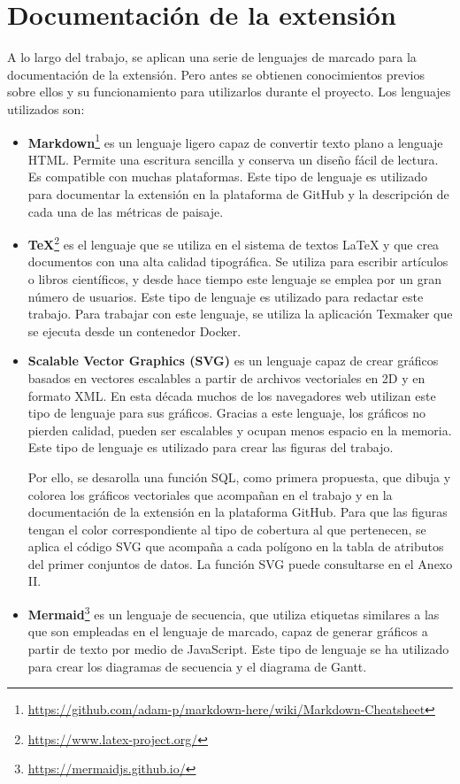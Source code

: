 \section{Documentación de la extensión}
A lo largo del trabajo, se aplican una serie de lenguajes de marcado para la documentación de la extensión. Pero antes se obtienen conocimientos previos sobre ellos y su funcionamiento para utilizarlos durante el proyecto. Los lenguajes utilizados son:
\begin{itemize}
\item\textbf{Markdown}\footnote{\url{https://github.com/adam-p/markdown-here/wiki/Markdown-Cheatsheet}} es un lenguaje ligero capaz de convertir texto plano a lenguaje HTML. Permite una escritura sencilla y conserva un diseño fácil de lectura. Es compatible con muchas plataformas. Este tipo de lenguaje es utilizado para documentar la extensión en la plataforma de GitHub y la descripción de cada una de las métricas de paisaje.
\item\textbf{TeX}\footnote{\url{https://www.latex-project.org/}} es el lenguaje que se utiliza en el sistema de textos LaTeX y que crea documentos con una alta calidad tipográfica. Se utiliza para escribir artículos o libros científicos, y desde hace tiempo este lenguaje se emplea por un gran número de usuarios. Este tipo de lenguaje es utilizado para redactar este trabajo. Para trabajar con este lenguaje, se utiliza la aplicación Texmaker que se ejecuta desde un contenedor Docker.
\item\textbf{Scalable Vector Graphics (SVG)} es un lenguaje capaz de crear gráficos basados en vectores escalables a partir de archivos vectoriales en 2D y en formato XML. En esta década muchos de los navegadores web utilizan este tipo de lenguaje para sus gráficos. Gracias a este lenguaje, los gráficos no pierden calidad, pueden ser escalables y ocupan menos espacio en la memoria. Este tipo de lenguaje es utilizado para crear las figuras del trabajo.

Por ello, se desarolla una función SQL, como primera propuesta, que dibuja y colorea los gráficos vectoriales que acompañan en el trabajo y en la documentación de la extensión en la plataforma GitHub. Para que las figuras tengan el color correspondiente al tipo de cobertura al que pertenecen, se aplica el código SVG que acompaña a cada polígono en la tabla de atributos del primer conjuntos de datos. La función SVG puede consultarse en el Anexo II.
\item\textbf{Mermaid}\footnote{\url{https://mermaidjs.github.io/}} es un lenguaje de secuencia, que utiliza etiquetas similares a las que son empleadas en el lenguaje de marcado, capaz de generar gráficos a partir de texto por medio de JavaScript. Este tipo de lenguaje se ha utilizado para crear los diagramas de secuencia y el diagrama de Gantt.
\end{itemize}





